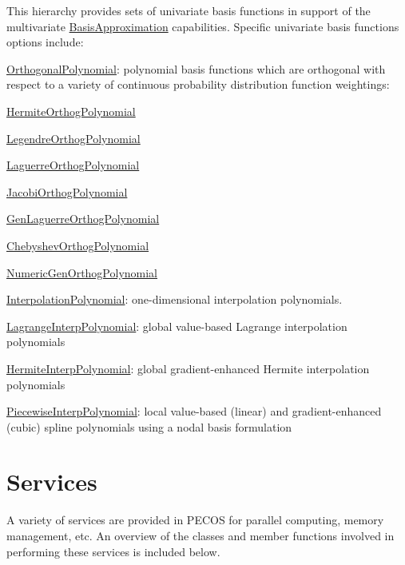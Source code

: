 This hierarchy provides sets of univariate basis functions in support of the multivariate \hyperlink{classPecos_1_1BasisApproximation}{Basis\+Approximation} capabilities. Specific univariate basis functions options include\+: 
\begin{DoxyItemize}
\item \hyperlink{classPecos_1_1OrthogonalPolynomial}{Orthogonal\+Polynomial}\+: polynomial basis functions which are orthogonal with respect to a variety of continuous probability distribution function weightings\+: 
\begin{DoxyItemize}
\item \hyperlink{classPecos_1_1HermiteOrthogPolynomial}{Hermite\+Orthog\+Polynomial} 
\item \hyperlink{classPecos_1_1LegendreOrthogPolynomial}{Legendre\+Orthog\+Polynomial} 
\item \hyperlink{classPecos_1_1LaguerreOrthogPolynomial}{Laguerre\+Orthog\+Polynomial} 
\item \hyperlink{classPecos_1_1JacobiOrthogPolynomial}{Jacobi\+Orthog\+Polynomial} 
\item \hyperlink{classPecos_1_1GenLaguerreOrthogPolynomial}{Gen\+Laguerre\+Orthog\+Polynomial} 
\item \hyperlink{classPecos_1_1ChebyshevOrthogPolynomial}{Chebyshev\+Orthog\+Polynomial} 
\item \hyperlink{classPecos_1_1NumericGenOrthogPolynomial}{Numeric\+Gen\+Orthog\+Polynomial} 
\end{DoxyItemize}
\item \hyperlink{classPecos_1_1InterpolationPolynomial}{Interpolation\+Polynomial}\+: one-\/dimensional interpolation polynomials. 
\begin{DoxyItemize}
\item \hyperlink{classPecos_1_1LagrangeInterpPolynomial}{Lagrange\+Interp\+Polynomial}\+: global value-\/based Lagrange interpolation polynomials 
\item \hyperlink{classPecos_1_1HermiteInterpPolynomial}{Hermite\+Interp\+Polynomial}\+: global gradient-\/enhanced Hermite interpolation polynomials 
\item \hyperlink{classPecos_1_1PiecewiseInterpPolynomial}{Piecewise\+Interp\+Polynomial}\+: local value-\/based (linear) and gradient-\/enhanced (cubic) spline polynomials using a nodal basis formulation


\end{DoxyItemize}
\end{DoxyItemize}\hypertarget{index_DevServices}{}\section{Services}\label{index_DevServices}
A variety of services are provided in P\+E\+C\+OS for parallel computing, memory management, etc. An overview of the classes and member functions involved in performing these services is included below.


